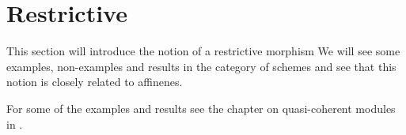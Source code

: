 \chapter{Restrictive}
This section will introduce the notion of a restrictive morphism
We will see some examples, non-examples and results in the category of schemes
and see that this notion is closely related to affinenes.

For some of the examples and results see the chapter on quasi-coherent modules in \cite{vakil}.











